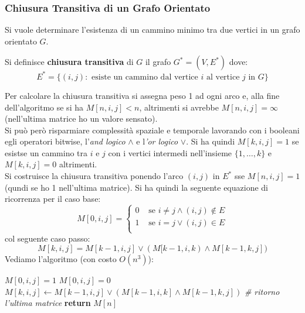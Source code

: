 \documentclass[a4paper,12pt, oneside]{book}
\begin{document}
\subsubsection{Chiusura Transitiva di un Grafo Orientato}
Si vuole determinare l'esistenza di un cammino minimo tra due vertici
in un grafo orientato $G$.
\begin{definizione}
  Si definisce \textbf{chiusura transitiva} di $G$ il grafo
  $G^{*}=(V,E^{*})$ dove:
  \[E^{*}=\{(i,j):\mbox{ esiste un cammino dal vertice } i \mbox{ al
      vertice }j \mbox{ in } G\}\]
\end{definizione}
Per calcolare la chiusura transitiva si assegna peso 1 ad ogni arco e,
alla fine dell'algoritmo se si ha $M[n,i,j]<n$, altrimenti si avrebbe
$M[n,i,j]=\infty$ (nell'ultima matrice ho un valore sensato).\\
Si può però risparmiare complessità spaziale e temporale lavorando con
i booleani egli operatori bitwise, l'\textit{and logico} $\wedge$ e
l\textit{'or logico} $\vee$. Si ha quindi $M[k,i,j]=1$ se esistse un
cammino tra $i$ e $j$ con i vertici intermedi nell'insieme
$\{1,\ldots,k\}$ e $M[k,i,j]=0$ altrimenti.\\
Si costruisce la chiusura transitiva ponendo l'arco $(i,j)$ in $E^{*}$
sse $M[n,i,j]=1$ (qundi se ho 1 nell'ultima matrice). Si ha quindi la
seguente equazione di ricorrenza per il caso base:
\[M[0,i,j]=
  \begin{cases}
    0 & \mbox{ se }i\neq j\wedge (i,j)\not\in E\\
    1 & \mbox{ se }i= j\vee (i,j)\in E\\
  \end{cases}
\]
col seguente caso passo:
\[M[k,i,j]=M[k-1,i,j]\vee (M[k-1,i,k)\wedge M[k-1,k,j])\]
Vediamo l'algoritmo (con costo $O(n^3)$):
\begin{algorithm}[H]
   \begin{algorithmic}
    \State $M[0,i,j]=1$
    \Else
    \State $M[0,i,j]=0$
    \EndIf
    \EndFor
    \EndFor
    \State $M[k,i,j]\gets M[k-1,i,j]\vee (M[k-1,i,k]\wedge M[k-1,k,j])$
    \EndFor
    \EndFor
    \EndFor
    \State \textit{\# ritorno l'ultima matrice }
    \State \textbf{return} $M[n]$
    \EndFunction
  \end{algorithmic}
\end{algorithm}
\end{document}
